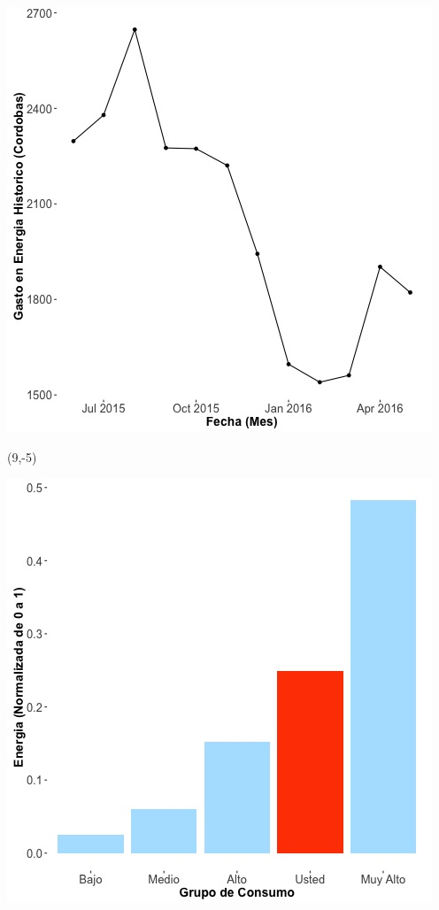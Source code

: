 \documentclass{article}\usepackage[]{graphicx}\usepackage[]{color}
\newenvironment{knitrout}{}{} %
\begin{document}
\begin{knitrout}
\color{fgcolor}
\includegraphics[scale=0.65]{figure/A1_historico_cordobas} 
\end{knitrout}

 \begin{textblock}{1}(9,-5)
\begin{minipage}{20em}
\begingroup

\endgroup
\end{minipage}
\end{textblock}

\begin{knitrout}
\color{fgcolor}
\includegraphics[scale=0.65]{figure/A1_neighbor_plot} 
\end{knitrout}
\end{document}
